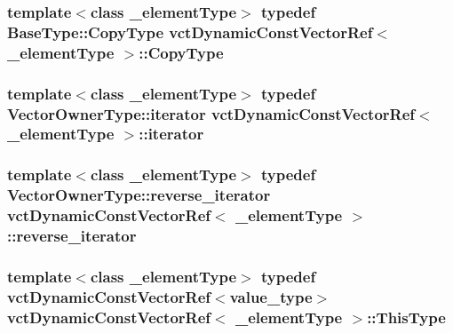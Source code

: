 \hypertarget{classvct_dynamic_const_vector_ref_a32b6a671d547b46f2f972fea2352579a}{
\subsubsection[{Copy\-Type}]{\setlength{\rightskip}{0pt plus 5cm}template$<$class \-\_\-element\-Type$>$ typedef {\bf Base\-Type\-::\-Copy\-Type} {\bf vct\-Dynamic\-Const\-Vector\-Ref}$<$ \-\_\-element\-Type $>$\-::{\bf Copy\-Type}}}\label{classvct_dynamic_const_vector_ref_a32b6a671d547b46f2f972fea2352579a}
\hypertarget{classvct_dynamic_const_vector_ref_ac4d0cbe331233df2f11b5a51d665006f}{
\subsubsection[{iterator}]{\setlength{\rightskip}{0pt plus 5cm}template$<$class \-\_\-element\-Type$>$ typedef {\bf Vector\-Owner\-Type\-::iterator} {\bf vct\-Dynamic\-Const\-Vector\-Ref}$<$ \-\_\-element\-Type $>$\-::{\bf iterator}}}\label{classvct_dynamic_const_vector_ref_ac4d0cbe331233df2f11b5a51d665006f}
\hypertarget{classvct_dynamic_const_vector_ref_a0f78f6ce35765714ea4dc8c182c6dc73}{
\subsubsection[{reverse\-\_\-iterator}]{\setlength{\rightskip}{0pt plus 5cm}template$<$class \-\_\-element\-Type$>$ typedef {\bf Vector\-Owner\-Type\-::reverse\-\_\-iterator} {\bf vct\-Dynamic\-Const\-Vector\-Ref}$<$ \-\_\-element\-Type $>$\-::{\bf reverse\-\_\-iterator}}}\label{classvct_dynamic_const_vector_ref_a0f78f6ce35765714ea4dc8c182c6dc73}
\hypertarget{classvct_dynamic_const_vector_ref_a8da0588e2e355e6224badfd42845195e}{
\subsubsection[{This\-Type}]{\setlength{\rightskip}{0pt plus 5cm}template$<$class \-\_\-element\-Type$>$ typedef {\bf vct\-Dynamic\-Const\-Vector\-Ref}$<$value\-\_\-type$>$ {\bf vct\-Dynamic\-Const\-Vector\-Ref}$<$ \-\_\-element\-Type $>$\-::{\bf This\-Type}}}\label{classvct_dynamic_const_vector_ref_a8da0588e2e355e6224badfd42845195e}
